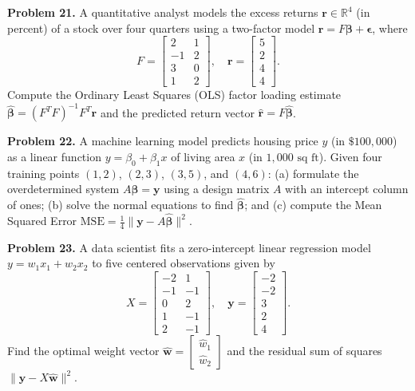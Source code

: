 \documentclass[11pt, letterpaper]{article}
\theoremstyle{definition}
\theoremstyle{remark}
\begin{document}
\textbf{Problem 21.} A quantitative analyst models the excess returns $\mathbf{r} \in \mathbb{R}^4$ (in percent) of a stock over four quarters using a two-factor model $\mathbf{r} = F\boldsymbol{\beta} + \boldsymbol{\epsilon}$, where
\[
F = \begin{bmatrix} 2 & 1 \\ -1 & 2 \\ 3 & 0 \\ 1 & 2 \end{bmatrix}, \quad \mathbf{r} = \begin{bmatrix} 5 \\ 2 \\ 4 \\ 4 \end{bmatrix}.
\]
Compute the Ordinary Least Squares (OLS) factor loading estimate $\hat{\boldsymbol{\beta}} = (F^T F)^{-1} F^T \mathbf{r}$ and the predicted return vector $\hat{\mathbf{r}} = F\hat{\boldsymbol{\beta}}$.

\textbf{Problem 22.} A machine learning model predicts housing price $y$ (in $\$100{,}000$) as a linear function $y = \beta_0 + \beta_1 x$ of living area $x$ (in $1{,}000\text{ sq ft}$). Given four training points $(1, 2)$, $(2, 3)$, $(3, 5)$, and $(4, 6)$: (a) formulate the overdetermined system $A\boldsymbol{\beta} = \mathbf{y}$ using a design matrix $A$ with an intercept column of ones; (b) solve the normal equations to find $\hat{\boldsymbol{\beta}}$; and (c) compute the Mean Squared Error $\text{MSE} = \frac{1}{4}\|\mathbf{y} - A\hat{\boldsymbol{\beta}}\|^2$.

\textbf{Problem 23.} A data scientist fits a zero-intercept linear regression model $y = w_1 x_1 + w_2 x_2$ to five centered observations given by
\[
X = \begin{bmatrix} -2 & 1 \\ -1 & -1 \\ 0 & 2 \\ 1 & -1 \\ 2 & -1 \end{bmatrix}, \quad \mathbf{y} = \begin{bmatrix} -2 \\ -2 \\ 3 \\ 2 \\ 4 \end{bmatrix}.
\]
Find the optimal weight vector $\hat{\mathbf{w}} = \begin{bmatrix} \hat{w}_1 \\ \hat{w}_2 \end{bmatrix}$ and the residual sum of squares $\|\mathbf{y} - X\hat{\mathbf{w}}\|^2$.
\end{document}
